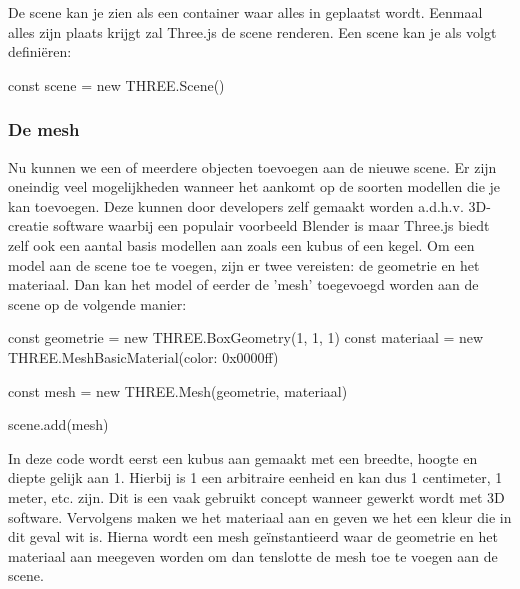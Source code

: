 De scene kan je zien als een container waar alles in geplaatst wordt. Eenmaal alles zijn plaats krijgt zal Three.js de scene renderen. Een scene kan je als volgt definiëren: 

\begin{LVerbatim}
const scene = new THREE.Scene()
\end{LVerbatim}

\subsubsection{De mesh}

Nu kunnen we een of meerdere objecten toevoegen aan de nieuwe scene. Er zijn oneindig veel mogelijkheden wanneer het aankomt op de soorten modellen die je kan toevoegen. Deze kunnen door developers zelf gemaakt worden a.d.h.v. 3D-creatie software waarbij een populair voorbeeld Blender is maar Three.js biedt zelf ook een aantal basis modellen aan zoals een kubus of een kegel.
Om een model aan de scene toe te voegen, zijn er twee vereisten: de geometrie en het materiaal. Dan kan het model of eerder de 'mesh' toegevoegd worden aan de scene op de volgende manier:

\begin{LVerbatim}
const geometrie = new THREE.BoxGeometry(1, 1, 1)
const materiaal = new THREE.MeshBasicMaterial({color: 0x0000ff})

const mesh = new THREE.Mesh(geometrie, materiaal)

scene.add(mesh)
\end{LVerbatim}

In deze code wordt eerst een kubus aan gemaakt met een breedte, hoogte en diepte gelijk aan 1. Hierbij is 1 een arbitraire eenheid en kan dus 1 centimeter, 1 meter, etc. zijn. Dit is een vaak gebruikt concept wanneer gewerkt wordt met 3D software. Vervolgens maken we het materiaal aan en geven we het een kleur die in dit geval wit is. Hierna wordt een mesh geïnstantieerd waar de geometrie en het materiaal aan meegeven worden om dan tenslotte de mesh toe te voegen aan de scene.

